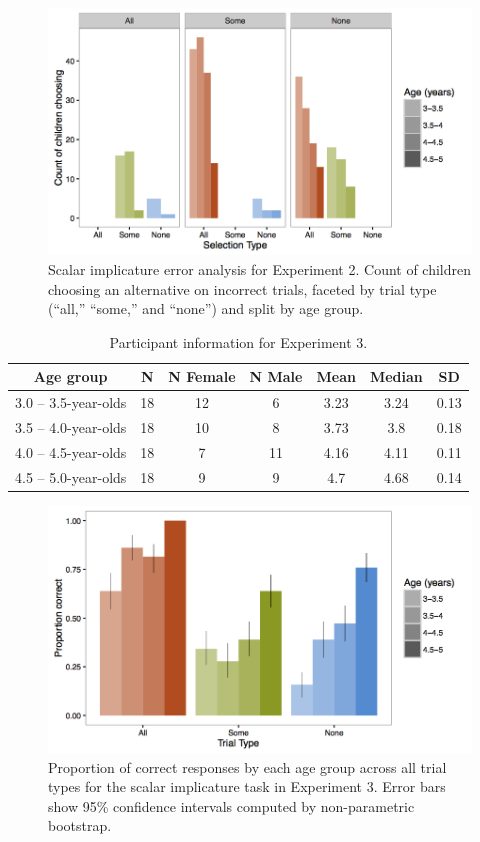 \documentclass[man]{apa2}
\begin{document}
\begin{figure}
 \begin{center}
  \includegraphics[width=4.5in]{figures/exp2_wrong.png}
  \caption{\label{fig:exp2_wrong} Scalar implicature error analysis for Experiment 2. Count of children choosing an alternative on incorrect trials, faceted by trial type (``all,'' ``some,'' and ``none'') and split by age group.}
 \end{center}
\end{figure}

\begin{table}
\centering
\begin{tabular}{ccccccc}
\hline
{\bf Age group} & {\bf N} & {\bf N Female} & {\bf N Male} & {\bf Mean} &  {\bf Median} & {\bf SD} \\
\hline
3.0 -- 3.5-year-olds & 18 & 12 & 6 & 3.23 & 3.24 & 0.13\\
3.5 -- 4.0-year-olds & 18 & 10 & 8 & 3.73 & 3.8 & 0.18\\
4.0 -- 4.5-year-olds & 18 & 7 & 11 & 4.16 & 4.11 & 0.11\\
4.5 -- 5.0-year-olds & 18 & 9 & 9 & 4.7 & 4.68 & 0.14\\
\hline
\end{tabular}
\caption{\label{tab:exp_3_demo} Participant information for Experiment 3.}
\end{table}

\begin{figure}
 \begin{center}
  \includegraphics[width=4.5in]{figures/exp3_SIperformance.png}
  \caption{\label{fig:exp3_perf} Proportion of correct responses by each age group across all trial types for the scalar implicature task in Experiment 3. Error bars show 95\% confidence intervals computed by non-parametric bootstrap.}
 \end{center}
\end{figure}
\end{document}
